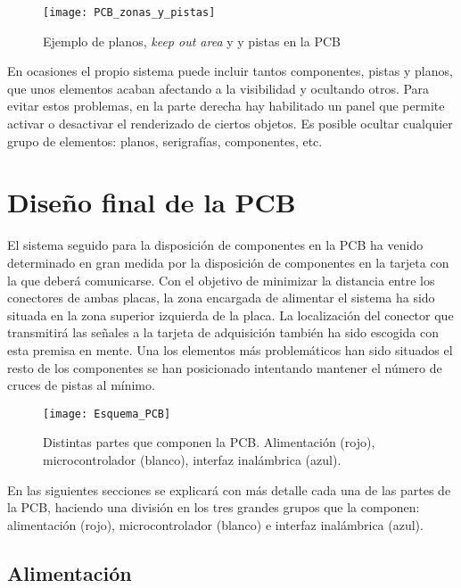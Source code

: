 \begin{figure} [H]
    \centering
    \texttt{[image: PCB\_zonas\_y\_pistas]}
    \caption{Ejemplo de planos, \textit{keep out area} y y pistas en la PCB}
    \label{fig:PCB_zonas_y_pistas}
\end{figure}

En ocasiones el propio sistema puede incluir tantos componentes, pistas y planos, que unos elementos acaban afectando a la visibilidad y ocultando otros. Para evitar estos problemas, en la parte derecha hay habilitado un panel que permite activar o desactivar el renderizado de ciertos objetos. Es posible ocultar cualquier grupo de elementos: planos, serigrafías, componentes, etc.
 
\clearpage 
 
\section{Diseño final de la PCB\label{sec:PCB_final}}

El sistema seguido para la disposición de componentes en la PCB ha venido determinado en gran medida por la disposición de componentes en la tarjeta con la que deberá comunicarse. Con el objetivo de minimizar la distancia entre los conectores de ambas placas, la zona encargada de alimentar el sistema ha sido situada en la zona superior izquierda de la placa. La localización del conector que transmitirá las señales a la tarjeta de adquisición también ha sido escogida con esta premisa en mente. Una los elementos más problemáticos han sido situados el resto de los componentes se han posicionado intentando mantener el número de cruces de pistas al mínimo.

\begin{figure} [H]
    \centering
    \texttt{[image: Esquema\_PCB]}
    \caption{Distintas partes que componen la PCB. Alimentación (rojo), microcontrolador (blanco), interfaz inalámbrica (azul).}
    \label{fig:Esquema_PCB}
\end{figure}

En las siguientes secciones se explicará con más detalle cada una de las partes de la PCB, haciendo una división en los tres grandes grupos que la componen: alimentación (rojo), microcontrolador (blanco) e interfaz inalámbrica (azul).

\clearpage

\subsection{Alimentación\label{sec:PCB_alimentacion}}


